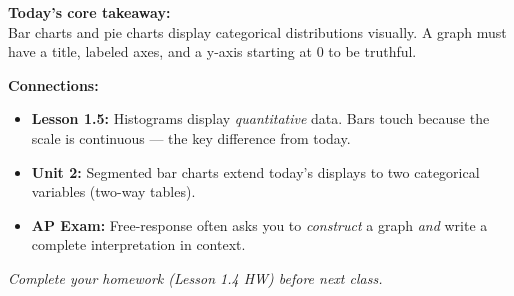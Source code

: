 \documentclass[aspectratio=169, 11pt]{beamer}
\begin{document}
{
\begin{frame}[t, plain]
  \vspace{1.2cm}\par
  \hspace{0.55cm}%
  \begin{minipage}{0.9\textwidth}
    \small

    {\color{goldacc}\bfseries Today's core takeaway:}\\[6pt]
    {\color{white}
    Bar charts and pie charts display categorical distributions visually.
    A graph must have a title, labeled axes, and a y-axis starting at 0
    to be truthful.}

    \vspace{0.55cm}
    {\color{skymid}\bfseries Connections:}
    \begin{itemize}
      \setlength{\itemsep}{0.35em}
      \item {\color{white}
            \textbf{Lesson 1.5:} Histograms display \textit{quantitative} data.
            Bars touch because the scale is continuous --- the key difference from today.}
      \item {\color{white}
            \textbf{Unit 2:} Segmented bar charts extend today's displays to
            two categorical variables (two-way tables).}
      \item {\color{white}
            \textbf{AP Exam:} Free-response often asks you to \textit{construct}
            a graph \textit{and} write a complete interpretation in context.}
    \end{itemize}

    \vspace{0.55cm}
    {\color{skymid}\small\itshape
      Complete your homework (Lesson 1.4 HW) before next class.}
  \end{minipage}
\end{frame}
}
\end{document}
